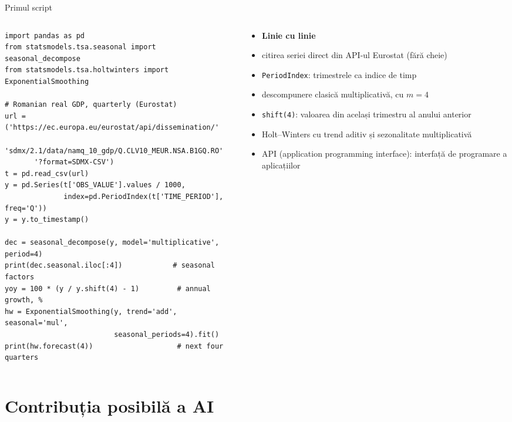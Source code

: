 \begin{frame}[fragile]{Primul script}
\itemsize{\scriptsize}
\begin{columns}[T]
\begin{column}{0.62\textwidth}
\begin{lstlisting}
import pandas as pd
from statsmodels.tsa.seasonal import seasonal_decompose
from statsmodels.tsa.holtwinters import ExponentialSmoothing

# Romanian real GDP, quarterly (Eurostat)
url = ('https://ec.europa.eu/eurostat/api/dissemination/'
       'sdmx/2.1/data/namq_10_gdp/Q.CLV10_MEUR.NSA.B1GQ.RO'
       '?format=SDMX-CSV')
t = pd.read_csv(url)
y = pd.Series(t['OBS_VALUE'].values / 1000,
              index=pd.PeriodIndex(t['TIME_PERIOD'], freq='Q'))
y = y.to_timestamp()

dec = seasonal_decompose(y, model='multiplicative', period=4)
print(dec.seasonal.iloc[:4])            # seasonal factors
yoy = 100 * (y / y.shift(4) - 1)         # annual growth, %
hw = ExponentialSmoothing(y, trend='add', seasonal='mul',
                          seasonal_periods=4).fit()
print(hw.forecast(4))                    # next four quarters
\end{lstlisting}
\end{column}
\begin{column}{0.35\textwidth}
\begin{itemize}
    \item \textbf{Linie cu linie}
    \item citirea seriei direct din API-ul Eurostat (fără cheie)
    \item \texttt{PeriodIndex}: trimestrele ca indice de timp
    \item descompunere clasică multiplicativă, cu $m = 4$
    \item \texttt{shift(4)}: valoarea din același trimestru al anului anterior
    \item Holt--Winters cu trend aditiv și sezonalitate multiplicativă
    \item API (application programming interface): interfață de programare a aplicațiilor
\end{itemize}
\end{column}
\end{columns}
\end{frame}


\section{Contribuția posibilă a AI}

